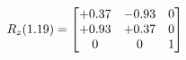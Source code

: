 \documentclass[preview]{standalone}
\begin{document}
\begin{align*}
\special{dvisvgm:raw <g id='unique000'>}R_{z}(1.19) = \begin{bmatrix}+0.37 & -0.93 & 0 \\+0.93 & +0.37 & 0 \\0 & 0 & 1\end{bmatrix}\special{dvisvgm:raw </g>}
\end{align*}
\end{document}

